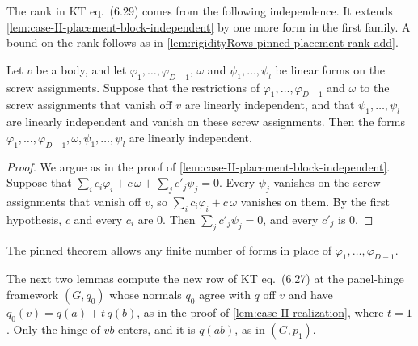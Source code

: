 The rank in KT eq.~(6.29) comes from the following independence. It
extends \cref{lem:case-II-placement-block-independent} by one more form
in the first family. A bound on the rank follows as in
\cref{lem:rigidityRows-pinned-placement-rank-add}.

\begin{lemma}
  \label{lem:case-III-conditional-block}
  \leanok
  Let $v$ be a body, and let $\varphi_1, \dots, \varphi_{D-1}$, $\omega$
  and $\psi_1, \dots, \psi_l$ be linear forms on the screw assignments.
  Suppose that the restrictions of $\varphi_1, \dots, \varphi_{D-1}$ and
  $\omega$ to the screw assignments that vanish off $v$ are linearly
  independent, and that $\psi_1, \dots, \psi_l$ are linearly independent
  and vanish on these screw assignments. Then the forms
  $\varphi_1, \dots, \varphi_{D-1}, \omega, \psi_1, \dots, \psi_l$ are
  linearly independent.
\end{lemma}
\begin{proof}
  \leanok
  We argue as in the proof of
  \cref{lem:case-II-placement-block-independent}. Suppose that
  $\sum_i c_i \varphi_i + c\,\omega + \sum_j c'_j \psi_j = 0$. Every
  $\psi_j$ vanishes on the screw assignments that vanish off $v$, so
  $\sum_i c_i \varphi_i + c\,\omega$ vanishes on them. By the first
  hypothesis, $c$ and every $c_i$ are $0$. Then
  $\sum_j c'_j \psi_j = 0$, and every $c'_j$ is $0$.
\end{proof}

\begin{fmlnote}
  The pinned theorem allows any finite number of forms in place of
  $\varphi_1, \dots, \varphi_{D-1}$.
\end{fmlnote}

The next two lemmas compute the new row of KT eq.~(6.27) at the
panel-hinge framework $(G, q_0)$ whose normals $q_0$ agree with $q$ off
$v$ and have $q_0(v) = q(a) + t\,q(b)$, as in the proof of
\cref{lem:case-II-realization}, where $t = 1$. Only the hinge of $vb$
enters, and it is $q(ab)$, as in $(G, p_1)$.

